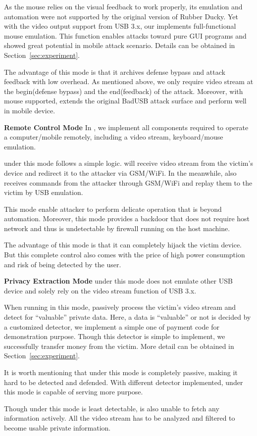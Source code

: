 As the mouse relies on the visual feedback to work properly, its emulation and automation were not supported by the original version of Rubber Ducky. Yet with the video output support from USB 3.x, our \tool implements full-functional mouse emulation. This function enables attacks toward pure GUI programs and showed great potential in mobile attack scenario. Details can be obtained in Section~\ref{sec:experiment}.

The advantage of this mode is that it archives defense bypass and attack feedback with low overhead. As mentioned above, we only require video stream at the begin(defense bypass) and the end(feedback) of the attack. Moreover, with mouse supported, \tool extends the original BadUSB attack surface and perform well in mobile device.

\textbf{Remote Control Mode}
In \tool, we implement all components required to operate a computer/mobile remotely, including a video stream, keyboard/mouse emulation.

\tool under this mode follows a simple logic. \tool will receive video stream from the victim's device and redirect it to the attacker via GSM/WiFi. In the meanwhile, \tool also receives commands from the attacker through GSM/WiFi and replay them to the victim by USB emulation.

This mode enable attacker to perform delicate operation that is beyond automation. Moreover, this mode provides a backdoor that does not require host network and thus is undetectable by firewall running on the host machine.

The advantage of this mode is that it can completely hijack the victim device. But this complete control also comes with the price of high power consumption and risk of being detected by the user.

\textbf{Privacy Extraction Mode}
\tool under this mode does not emulate other USB device and solely rely on the video stream function of USB 3.x.

When running in this mode, \tool passively process the victim's video stream and detect for ``valuable'' private data.  Here, a data is ``valuable'' or not is decided by a customized detector, we implement a simple one of payment code for demonstration purpose. Though this detector is simple to implement, we successfully transfer money from the victim. More detail can be obtained in Section~\ref{sec:experiment}.

It is worth mentioning that \tool under this mode is completely passive, making it hard to be detected and defended. With different detector implemented, \tool under this mode is capable of serving more purpose.

Though \tool under this mode is least detectable, \tool is also unable to fetch any information actively. All the video stream has to be analyzed and filtered to become usable private information.
